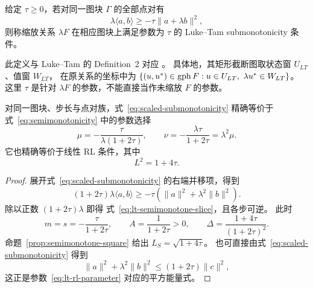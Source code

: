 \begin{definition}
\label{def:lt-submonotonicity}
给定 $\tau\ge0$，若对同一图块 $\Gamma$ 的全部点对有
\begin{equation}
 \lambda\langle a,b\rangle\ge-\tau\|a+\lambda b\|^2,
 \label{eq:scaled-submonotonicity}
\end{equation}
则称缩放关系 $\lambda F$ 在相应图块上满足参数为 $\tau$ 的
Luke--Tam submonotonicity 条件。
\end{definition}

此定义与 Luke--Tam 的 Definition~2 对应
\cite{LukeTam2025GeneralizedMonotonicity}。
具体地，其矩形截断图取状态窗 $U_{LT}$、值窗 $W_{LT}$，
在原关系的坐标中为
$\{(u,u^*)\in\operatorname{gph} F:u\in U_{LT},\ \lambda u^*\in W_{LT}\}$。
这里 $\tau$ 是针对 $\lambda F$ 的参数，不能直接当作未缩放 $F$ 的参数。

\begin{proposition}
\label{prop:linear-identification}
对同一图块、步长与点对族，式~\eqref{eq:scaled-submonotonicity}
精确等价于式~\eqref{eq:semimonotonicity} 中的参数选择
\begin{equation}
 \mu=-\frac{\tau}{\lambda(1+2\tau)},\qquad
 \nu=-\frac{\lambda\tau}{1+2\tau}=\lambda^2\mu.
 \label{eq:lt-semimonotone-slice}
\end{equation}
它也精确等价于线性 RL 条件，其中
\begin{equation}
 L^2=1+4\tau.
 \label{eq:lt-rl-parameter}
\end{equation}
\end{proposition}

\begin{proof}
展开式~\eqref{eq:scaled-submonotonicity} 的右端并移项，得到
\[
 (1+2\tau)\lambda\langle a,b\rangle
 \ge-\tau(\|a\|^2+\lambda^2\|b\|^2).
\]
除以正数 $(1+2\tau)\lambda$ 即得
式~\eqref{eq:lt-semimonotone-slice}，且各步可逆。
此时
\[
 m=s=-\frac{\tau}{1+2\tau},\qquad
 A=\frac1{1+2\tau}>0,\qquad
 \Delta=\frac{1+4\tau}{(1+2\tau)^2}.
\]
命题~\ref{prop:semimonotone-square} 给出 $L_S=\sqrt{1+4\tau}$。
也可直接由式~\eqref{eq:scaled-submonotonicity} 得到
\[
 \|a\|^2+\lambda^2\|b\|^2\le(1+2\tau)\|c\|^2,
\]
这正是参数~\eqref{eq:lt-rl-parameter} 对应的平方能量式。
\end{proof}

